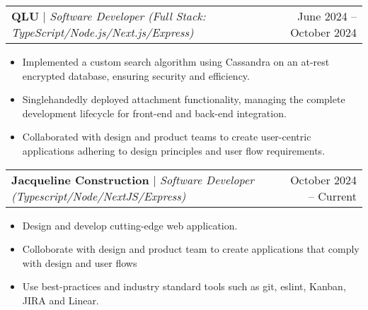 \documentclass{article}%
\makeatletter
\newcommand{\resumeProjectHeading}[2]{
    \item
    \begin{tabular*}{0.97\textwidth}{l@{\extracolsep{\fill}}r}
      \small#1 & #2 \\
    \end{tabular*}\vspace{-7pt}
}
\makeatother
\begin{document}
          \resumeProjectHeading
          {\textbf{QLU}\vspace{8pt} $|$ \footnotesize\emph{Software Developer (Full Stack: TypeScript/Node.js/Next.js/Express)}}{June 2024 -- October 2024}
          \begin{itemize}
            \item Implemented a custom search algorithm using Cassandra on an at-rest encrypted database, ensuring security and efficiency.
            \item Singlehandedly deployed attachment functionality, managing the complete development lifecycle for front-end and back-end integration.
            \item Collaborated with design and product teams to create user-centric applications adhering to design principles and user flow requirements.
          \end{itemize}
          
          \resumeProjectHeading
          {\textbf{Jacqueline Construction}\vspace{8pt} $|$ \footnotesize\emph{Software Developer (Typescript/Node/NextJS/Express)}}{October 2024 -- Current}
            \begin{itemize}
              \item 
              Design and develop cutting-edge web application. 
              \item 
              Colloborate with design and product team to create applications that comply with design and user flows
              \item 
              Use best-practices and industry standard tools such as git, eslint, Kanban, JIRA and Linear. 
          \end{itemize}

\end{document}
